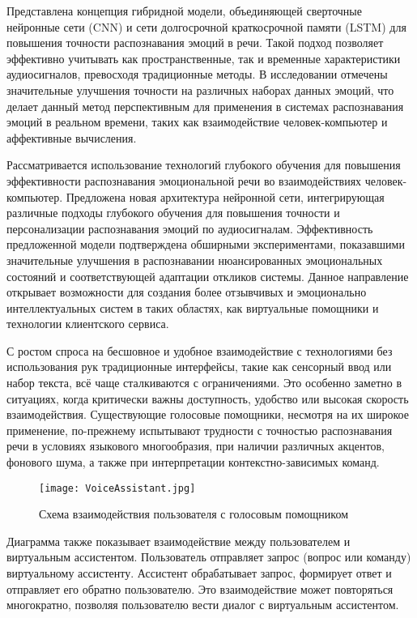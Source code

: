  Представлена концепция гибридной модели, объединяющей сверточные нейронные сети (CNN) и сети долгосрочной краткосрочной памяти (LSTM) для повышения точности распознавания эмоций в речи. Такой подход позволяет эффективно учитывать как пространственные, так и временные характеристики аудиосигналов, превосходя традиционные методы. В исследовании отмечены значительные улучшения точности на различных наборах данных эмоций, что делает данный метод перспективным для применения в системах распознавания эмоций в реальном времени, таких как взаимодействие человек-компьютер и аффективные вычисления.
	
 Рассматривается использование технологий глубокого обучения для повышения эффективности распознавания эмоциональной речи во взаимодействиях человек-компьютер. Предложена новая архитектура нейронной сети, интегрирующая различные подходы глубокого обучения для повышения точности и персонализации распознавания эмоций по аудиосигналам. Эффективность предложенной модели подтверждена обширными экспериментами, показавшими значительные улучшения в распознавании нюансированных эмоциональных состояний и соответствующей адаптации откликов системы. Данное направление открывает возможности для создания более отзывчивых и эмоционально интеллектуальных систем в таких областях, как виртуальные помощники и технологии клиентского сервиса.
 
 С ростом спроса на бесшовное и удобное взаимодействие с технологиями без использования рук традиционные интерфейсы, такие как сенсорный ввод или набор текста, всё чаще сталкиваются с ограничениями. Это особенно заметно в ситуациях, когда критически важны доступность, удобство или высокая скорость взаимодействия. Существующие голосовые помощники, несмотря на их широкое применение, по-прежнему испытывают трудности с точностью распознавания речи в условиях языкового многообразия, при наличии различных акцентов, фонового шума, а также при интерпретации контекстно-зависимых команд.
 
 \begin{figure}[H]
 	\centering
 	\texttt{[image: VoiceAssistant.jpg]}
 	\caption{Схема взаимодействия пользователя с голосовым помощником}
 	\label{fig:VoiceAssistant}
 \end{figure}
 
 
 Диаграмма также показывает взаимодействие между пользователем и виртуальным ассистентом. Пользователь отправляет запрос (вопрос или команду) виртуальному ассистенту. Ассистент обрабатывает запрос, формирует ответ и отправляет его обратно пользователю. Это взаимодействие может повторяться многократно, позволяя пользователю вести диалог с виртуальным ассистентом.
 
